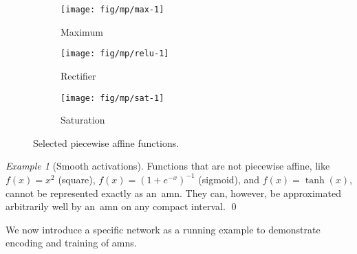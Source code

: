 \documentclass[10pt]{article}
\theoremstyle{remark}
\newtheorem{example}{Example}
\theoremstyle{definition}
\theoremstyle{plain}
\begin{document}
\begin{figure}[htpb]
	\centering
	\hspace{-3em}
    \begin{subfigure}{0.33\linewidth}
		\centering
        \texttt{[image: fig/mp/max-1]}
		\caption{Maximum}
		\label{fig:max1}
    \end{subfigure}
    \begin{subfigure}{0.25\linewidth}
		\centering
        \texttt{[image: fig/mp/relu-1]}
		\caption{Rectifier}
        \label{fig:relu1}
    \end{subfigure}
    \begin{subfigure}{0.3\linewidth}
		\centering
        \texttt{[image: fig/mp/sat-1]}
		\caption{Saturation}
        \label{fig:sat1}
    \end{subfigure}
	\caption{Selected piecewise affine functions.}
    \label{fig:impl_pwl}
\end{figure}

\begin{example}[Smooth activations]
Functions that are not piecewise affine, like $f(x)=x^2$ (square), $f(x) =
(1+e^{-x})^{-1}$ (sigmoid), and $f(x)=\tanh(x)$, cannot be represented exactly
as an~\acs{amn}. They can, however, be approximated arbitrarily well by
an~\acs{amn} on any compact interval.
\qed
\end{example}

We now introduce a specific network as a running
example to demonstrate encoding and training of \acsp{amn}.
\end{document}
